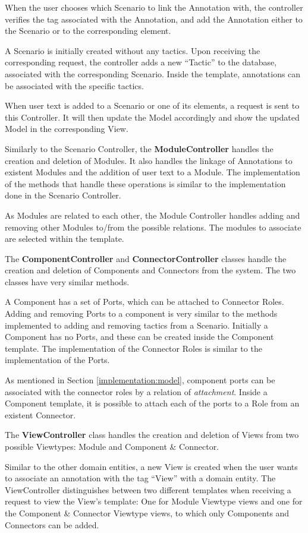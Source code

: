 \documentclass[conference]{IEEEtran}
\begin{document}
When the user chooses which Scenario to link the Annotation with, the controller verifies the tag associated with the Annotation, and add the Annotation either to the Scenario or to the corresponding element. 

A Scenario is initially created without any tactics. Upon receiving the corresponding request, the controller adds a new ``Tactic'' to the database, associated with the corresponding Scenario. Inside the template, annotations can be associated with the specific tactics. 

When user text is added to a Scenario or one of its elements, a request is sent to this Controller. It will then update the Model accordingly and show the updated Model in the corresponding View.

Similarly to the Scenario Controller, the \textbf{ModuleController} handles the creation and deletion of Modules. It also handles the linkage of Annotations to existent Modules and the addition of user text to a Module. The implementation of the methods that handle these operations is similar to the implementation done in the Scenario Controller.

As Modules are related to each other, the Module Controller handles adding and removing other Modules to/from the possible relations. The modules to associate are selected within the template. 

The \textbf{ComponentController} and \textbf{ConnectorController} classes handle the creation and deletion of Components and Connectors from the system. The two classes have very similar methods.

A Component has a set of Ports, which can be attached to Connector Roles. Adding and removing Ports to a component is very similar to the methods implemented to adding and removing tactics from a Scenario. Initially a Component has no Ports, and these can be created inside the Component template. The implementation of the Connector Roles is similar to the implementation of the Ports.

As mentioned in Section \ref{implementation:model}, component ports can be associated with the connector roles by a relation of \textit{attachment}. Inside a Component template, it is possible to attach each of the ports to a Role from an existent Connector.

The \textbf{ViewController} class handles the creation and deletion of Views from two possible Viewtypes: Module and Component \& Connector. 

Similar to the other domain entities, a new View is created when the user wants to associate an annotation with the tag ``View'' with a domain entity.
The ViewController distinguishes between two different templates when receiving a request to view the View's template: One for Module Viewtype views and one for the Component \& Connector Viewtype views, to which only Components and Connectors can be added.
 
\end{document}
